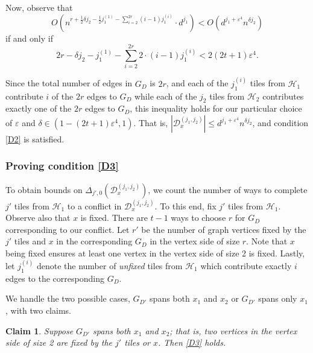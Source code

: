 \documentclass{article}
\newtheorem{claim}[theorem]{Claim}
\theoremstyle{definition}
\newcommand\cH{{\mathcal H}}
\newcommand{\cD}{\mathcal{D}}
\begin{document}
Now, observe that 
$$
    O \left(n^{r + \frac{1}{2} \delta j_2 - \frac{1}{2} j_1^{(1)} - \sum_{i=2}^{2r} (i-1) j_1^{(i)}} \cdot d^{j_1} \right) < O(d^{j_1 + \varepsilon^4} n^{\delta j_2} )
$$
if and only if
$$
    2r - \delta j_2 - j_1^{(1)} - \sum_{i=2}^{2r} 2 \cdot (i-1) j_1^{(i)} < 2 (2t+1) \varepsilon^4.
$$

Since the total number of edges in $G_D$ is $2r$, and each of the $j_1^{(i)}$ tiles from $\cH_1$ contribute $i$ of the $2r$ edges to $G_D$ while each of the $j_2$ tiles from $\cH_2$ contributes exactly one of the $2r$ edges to $G_D$, this inequality holds for our particular choice of $\varepsilon$ and $\delta \in \left( 1-(2t+1) \varepsilon^4, 1 \right) $. That is, $\left| \cD_x^{(j_1,j_2)} \right| \leq d^{j_1 + \varepsilon^4} n^{ \delta j_2}$, and condition \ref{D2} is satisfied.


\subsubsection{Proving condition \ref{D3}}

To obtain bounds on $\Delta_{j',0} \left( \cD_x^{(j_1,j_2)} \right)$, we count the number of ways to complete $j'$ tiles from $\cH_1$ to a conflict in $\cD_x^{(j_1,j_2)}$.  To this end, fix $j'$ tiles from $\cH_1$.  Observe also that $x$ is fixed.  There are $t-1$ ways to choose $r$ for $G_D$ corresponding to our conflict.  Let $r'$  be the number of graph vertices fixed by the $j'$ tiles and $x$ in the corresponding $G_D$ in the vertex side of size $r$.  Note that $x$ being fixed ensures at least one vertex in the vertex side of size 2 is fixed.  Lastly, let $j_1^{(i)}$ denote the number of \emph{unfixed} tiles from $\cH_1$ which contribute exactly $i$ edges to the corresponding $G_D$.  

We handle the two possible cases, $G_{D'}$ spans both $x_1$ and $x_2$ or $G_{D'}$ spans only $x_1$, with two claims.

\begin{claim}
    Suppose $G_{D'}$ spans both $x_1$ and $x_2$; that is, two vertices in the vertex side of size 2 are fixed by the $j'$ tiles or $x$. Then \ref{D3} holds.
\end{claim}
\end{document}
